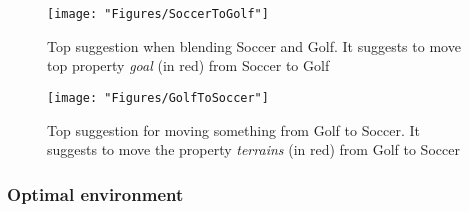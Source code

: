 \begin{figure} \centering \texttt{[image: "Figures/SoccerToGolf"]} \caption{Top suggestion when blending Soccer and Golf. It suggests to move top property \emph{goal} (in red) from Soccer to Golf } \label{fig:SoccerToGolf} \end{figure}

\begin{figure} \centering \texttt{[image: "Figures/GolfToSoccer"]} \caption{Top suggestion for moving something from Golf to Soccer. It suggests to move the property \emph{terrains} (in red) from Golf to Soccer } \label{fig:GolfToSoccer} \end{figure}

\subsubsection{Optimal environment}



